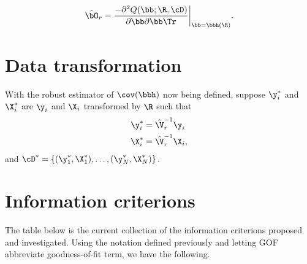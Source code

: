 \documentclass{article}
\begin{document}
\begin{equation*}
  \hat{\bO}_{r} = \frac{-\partial^{2}Q(\bb; \R, \cD)}{\partial\bb\partial\bb\Tr}\bigg|_{\bb = \bbh(\R)}.
\end{equation*}

\section*{Data transformation}
With the robust estimator of $\cov(\bbh)$ now being defined, suppose $\y_{i}^{*}$ and $\X_{i}^{*}$ are $\y_{i}$ and $\X_{i}$ transformed by $\R$ such that
\begin{align*}
  \y_{i}^{*} &= \hat{\V}_{r}^{-1}\y_{i} \\
  \X_{i}^{*} &= \hat{\V}_{r}^{-1}\X_{i},
\end{align*}
and $\cD^{*} = \left\{(\y_{1}^{*}, \X_{1}^{*}), \ldots, (\y_{N}^{*}, \X_{N}^{*})\right\}.$

\pagebreak

\section*{Information criterions}
The table below is the current collection of the information criterions proposed and investigated. Using the notation defined previously and letting GOF abbreviate goodness-of-fit term, we have the following.
\end{document}

